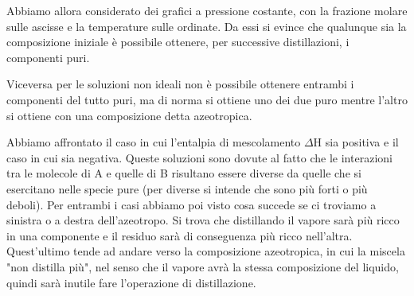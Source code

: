 Abbiamo allora considerato dei grafici a pressione costante, con la frazione molare sulle ascisse e la temperature sulle ordinate. Da essi si evince che qualunque sia la composizione iniziale è possibile ottenere, per successive distillazioni, i componenti puri.

Viceversa per le soluzioni non ideali non è possibile ottenere entrambi i componenti del tutto puri, ma di norma si ottiene uno dei due puro mentre l'altro si ottiene con una composizione detta azeotropica.

Abbiamo affrontato il caso in cui l'entalpia di mescolamento $\Delta$H sia positiva e il caso in cui sia negativa. Queste soluzioni sono dovute al fatto che le interazioni tra le molecole di A e quelle di B risultano essere diverse da quelle che si esercitano nelle specie pure (per diverse si intende che sono più forti o più deboli). Per entrambi i casi abbiamo poi visto cosa succede se ci troviamo a sinistra o a destra dell'azeotropo. Si trova che distillando il vapore sarà più ricco in una componente e il residuo sarà di conseguenza più ricco nell'altra. Quest'ultimo tende ad andare verso la composizione azeotropica, in cui la miscela "non distilla più", nel senso che il vapore avrà la stessa composizione del liquido, quindi sarà inutile fare l'operazione di distillazione.